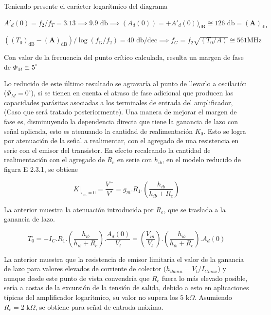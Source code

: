 Teniendo presente el carácter logarítmico del diagrama

$A'_d(0) = f_2 / f_T = 3.13 \implies 9.9 \text{ db} \implies (A_d(0)) = + A'_d(0))_{\text{dB}} \cong 126 \text{ db} = \mathbf{(A)}_{\text{db}}$

$((T_0)_{\text{dB}} - \mathbf{(A)}_{\text{dB}}) / \log(f_G / f_2) = 40 \text{ db/dec} \implies f_G = f_2 \sqrt{(T_0/A)} \cong 561 \text{MHz}$

Con valor de la frecuencia del punto crítico calculada, resulta un margen de fase de $\Phi_M \cong 5^\circ$

Lo reducido de este último resultado se agravaría al punto de llevarlo a oscilación ($\Phi_M = 0^\circ$), si se tienen en cuenta el atraso de fase adicional que producen las capacidades parásitas asociadas a los terminales de entrada del amplificador, (Caso que será tratado posteriormente).
Una manera de mejorar el margen de fase es, disminuyendo la dependencia directa que tiene la ganancia de lazo con señal aplicada, esto es atenuando la cantidad de realimentación $K_0$. Esto se logra por atenuación de la señal a realimentar, con el agregado de una resistencia en serie con el emisor del transistor.
En efecto recalcando la cantidad de realimentación con el agregado de $R_e$ en serie con $h_{ib}$, en el modelo reducido de figura E 2.3.1, se obtiene

\begin{equation*}
    K|_{v_{in}=0} = \frac{V^-}{V'} = g_m . R_1 . \left( \frac{h_{ib}}{h_{ib} + R_e} \right)
\end{equation*}

La anterior muestra la atenuación introducida por $R_e$, que se traslada a la ganancia de lazo.

\begin{equation*}
    T_0 = -I_C . R_1 . \left( \frac{h_{ib}}{h_{ib} + R_e} \right) . \frac{A_d(0)}{V_t} = \left( \frac{V_{in}}{V_t} \right) . \left( \frac{h_{ib}}{h_{ib} + R_e} \right) . A_d(0)
\end{equation*}

La anterior muestra que la resistencia de emisor limitaría el valor de la ganancia de lazo para valores elevados de corriente de colector ($h_{ibmin} = V_t / I_{Cmax}$) y aunque desde este punto de vista convendría que $R_e$ fuera lo más elevado posible, sería a costas de la excursión de la tensión de salida, debido a esto en aplicaciones típicas del amplificador logarítmico, su valor no supera los $5 \text{ k}\Omega$. Asumiendo $R_e = 2 \text{ k}\Omega$, se obtiene para señal de entrada máxima.

